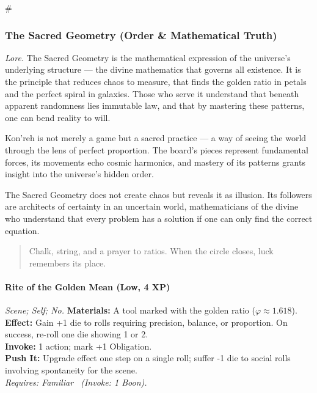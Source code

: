 # %

\subsubsection{The Sacred Geometry (Order \& Mathematical Truth)}
\textit{Lore.} The Sacred Geometry is the mathematical expression of the universe's underlying structure --- the divine mathematics that governs all existence. It is the principle that reduces chaos to measure, that finds the golden ratio in petals and the perfect spiral in galaxies. Those who serve it understand that beneath apparent randomness lies immutable law, and that by mastering these patterns, one can bend reality to will.

Kon'reh is not merely a game but a sacred practice --- a way of seeing the world through the lens of perfect proportion. The board's pieces represent fundamental forces, its movements echo cosmic harmonics, and mastery of its patterns grants insight into the universe's hidden order.

The Sacred Geometry does not create chaos but reveals it as illusion. Its followers are architects of certainty in an uncertain world, mathematicians of the divine who understand that every problem has a solution if one can only find the correct equation.

\begin{quote}
Chalk, string, and a prayer to ratios. When the circle closes, luck remembers its place.
\end{quote}

\paragraph*{Rite of the Golden Mean (Low, 4 XP)} \emph{Scene; Self; No.}
\textbf{Materials:} A tool marked with the golden ratio ($\varphi \approx 1.618$).\\
\textbf{Effect:} Gain +1 die to rolls requiring precision, balance, or proportion. On success, re-roll one die showing 1 or 2.\\
\textbf{Invoke:} 1 action; mark +1 Obligation.\\
\textbf{Push It:} Upgrade effect one step on a single roll; suffer -1 die to social rolls involving spontaneity for the scene.\\
\emph{Requires: Familiar \ (\textit{Invoke:} 1 Boon).}

